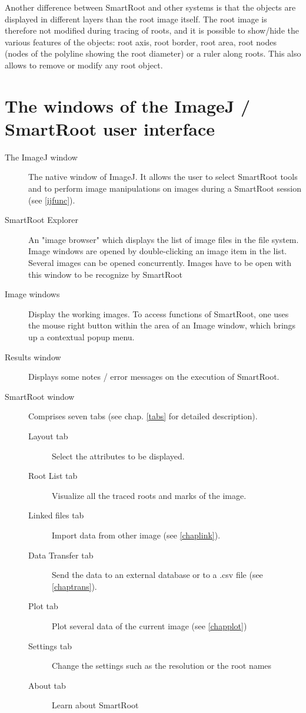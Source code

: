 \documentclass[a4paper,english,10pt]{report}
\begin{document}
Another difference between SmartRoot and other systems is that the objects are displayed in different layers than the root image itself. The root image is therefore not modified during tracing of roots, and it is possible to show/hide the various features of the objects: root axis, root border, root area, root nodes (nodes of the polyline showing the root diameter) or a ruler along roots. This also allows to remove or modify any root object.\\


\newpage
{\color{coolSection}\section{The windows of the ImageJ / SmartRoot user interface}}
\label{sr-ij}

\begin{description}
\item [The ImageJ window] The native window of ImageJ. It allows the user to select SmartRoot tools and to perform image manipulations on images during a SmartRoot session (see \ref{ijfunc}).

\item [SmartRoot Explorer] An "image browser" which displays the list of image files in the file system. Image windows are opened by double-clicking an image item in the list. Several images can be opened concurrently. Images have to be open with this window to be recognize by SmartRoot

\item [Image windows] Display the working images. To access functions of SmartRoot, one uses the mouse right button within the area of an Image window, which brings up a contextual popup menu.

\item [Results window] Displays some notes / error messages on the execution of SmartRoot.

\item [SmartRoot window] Comprises seven tabs (see chap. \ref{tabs} for detailed description). 
	\begin{description}
	\item [Layout tab] Select the attributes to be displayed. 
	\item [Root List tab]Visualize all the traced roots and marks of the image. 
	\item [Linked files tab] Import data from other image (see \ref{chaplink}).
	\item [Data Transfer tab] Send the data to an external database or to a .csv file (see \ref{chaptrans}).
	\item [Plot tab] Plot several data of the current image (see \ref{chapplot})
	\item [Settings tab] Change the settings such as the resolution or the root names
	\item [About tab] Learn about SmartRoot
	\end{description}
\end{description}
\end{document}
